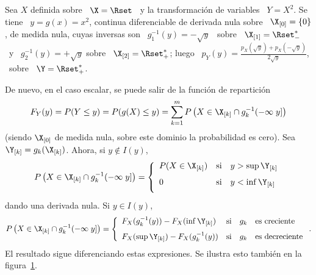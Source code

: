 \begin{figure}[h!]
\begin{center}  \end{center}
%
\label{Fig:MP:TransformacionVA}
\end{figure}

\begin{ejemplo}
\label{Ej:MP:TransformacionNoBiyectiva}
%
  Sea $X$ definida sobre  \ $\X = \Rset$ \ y la  transformaci\'on de variables \
  $Y = X^2$.   Se tiene \ $y  = g(x) = x^2$, continua  diferenciable de derivada
  nula  sobre \  $\X_{[0]} =  \{ 0  \}$, de  medida nula,  cuyas inversas  son \
  $g_1^{-1}(y) = - \sqrt{y}$ \ sobre \ $\X_{[1]} = \Rset_-^*$ \ y \ $g_2^{-1}(y)
  =  +   \sqrt{y}$  sobre   \  $\X_{[2]}  =   \Rset_+^*$;  luego  \   $p_Y(y)  =
  \frac{p_X(\sqrt{y})  +   p_X(-\sqrt{y})}{2  \sqrt{y}}$,   \  sobre  \   $\Y  =
  \Rset_+^*$.
\end{ejemplo}

De nuevo, en el caso escalar, se puede salir de la funci\'on de repartici\'on
%
\[
F_Y(y) =  P(Y \le y) = P(  g(X) \le y )  = \sum_{k=1}^m P\left( X  \in \X_{[k]} \cap
  g_k^{-1}(-\infty \; y] \right)
\]
%
(siendo  $\X_{[0]}$  de medida  nula,  sobre  este  dominio la  probabilidad  es
cero). Sea $\Y_{[k]} = g_k(\X_{[k]})$. Ahora, si $y \not\in I(y)$,
%
\[
P\left(   X   \in  \X_{[k]}   \cap   g_k^{-1}(-\infty  \;   y]  \right)   =
\left\{\begin{array}{lll}
%
P(X \in \X_{[k]}) & \mbox{si} & y > \sup \Y_{[k]}\\[2.5mm]
%
0 & \mbox{si} & y < \inf \Y_{[k]}\\[2.5mm]
\end{array}\right.
\]
%
dando una derivada nula. Si $y \in I(y)$,
%
\[
P\left(   X   \in  \X_{[k]}   \cap   g_k^{-1}(-\infty  \;   y]  \right)   =
\left\{\begin{array}{lll}
%
F_X(g_k^{-1}(y)) - F_X(\inf \Y_{[k]}) & \mbox{si} & g_k \quad \mbox{es creciente}\\[2.5mm]
%
F_X(\sup \Y_{[k]}) - F_X(g_k^{-1}(y))  & \mbox{si} & g_k \quad \mbox{es decreciente}
\end{array}\right..
\]
%
El resultado sigue diferenciando estas expresiones. Se ilustra esto tambi\'en en
la figura~\ref{Fig:MP:TransformacionVA}.

